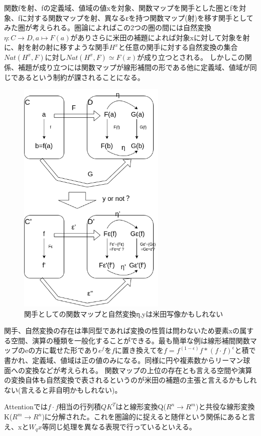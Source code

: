 \documentclass[a4paper,11pt]{article}
\begin{document}
関数fを射、fの定義域、値域の値xを対象、関数マップを関手とした圏とfを対象、fに対する関数マップを射、異なるεを持つ関数マップ(射)を移す関手としてみた圏が考えられる。圏論によればこの2つの圏の間には自然変換$\eta:C \rightarrow D, a \mapsto F(a)$がありさらに米田の補題によれば対象xに対して対象を射に、射を射の射に移すような関手$H^x$と任意の関手に対する自然変換の集合$Nat(H^x,F)$に対し$Nat(H^x,F) \simeq F(x)$が成り立つとされる。
しかしこの関係、補題が成り立つには関数マップが線形補間の形である他に定義域、値域が同じであるという制約が課されることになる。

\begin{figure}[htbp]
\begin{center}
\includegraphics[width=200pt]{fig/yoneda.png}
\caption{関手としての関数マップと自然変換η,yは米田写像かもしれない}
\end{center}
\end{figure}
  
関手、自然変換の存在は準同型であれば変換の性質は問わないため要素xの属する空間、演算の種類を一般化することができる。最も簡単な例は線形補間関数マップのeの方に載せた形であり$e^f$を$f$に置き換えてを$f=f^(1-\epsilon)f*(f\cdot f)^\epsilon$と積で書かれ、定義域、値域は正の値のみになる。同様に円や複素数からリーマン球面への変換などが考えられる。
関数マップの上位の存在とも言える空間や演算の変換自体も自然変換で表されるというのが米田の補題の主張と言えるかもしれない(言えると非自明かもしれない)。

Attentionでは$f\cdot f$相当の行列積$QK^T$はと線形変換Q($R^n \rightarrow R^m$)と共役な線形変換K($R^m \rightarrow R^n$)に分解された。これを圏論的に捉えると随伴という関係にあると言え、xと$W_qx$等同じ処理を異なる表現で行っているといえる。
\end{document}
